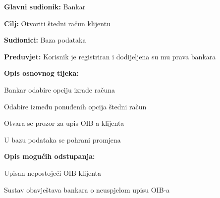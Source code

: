 \noindent {}
\begin{packed_item}

  \item \textbf{Glavni sudionik: }Bankar
  \item  \textbf{Cilj:} Otvoriti štedni račun klijentu
  \item  \textbf{Sudionici:} Baza podataka
  \item  \textbf{Preduvjet:} Korisnik je registriran i dodijeljena su mu prava bankara
  \item  \textbf{Opis osnovnog tijeka:}
  
  \item[] \begin{packed_enum}

    \item Bankar odabire opciju izrade računa
    \item Odabire između  ponuđenih opcija štedni račun
    \item Otvara se prozor za upis OIB-a klijenta 
    \item U bazu podataka se pohrani promjena 
  \end{packed_enum}
  
  \item  \textbf{Opis mogućih odstupanja:}
  
  \item[] \begin{packed_item}

    \item[3.a] Upisan nepostojeći OIB klijenta 
    \item[] \begin{packed_enum}
      
      \item Sustav obavještava bankara o neuspjelom upisu OIB-a
      
    \end{packed_enum}
    
  \end{packed_item}
\end{packed_item}

